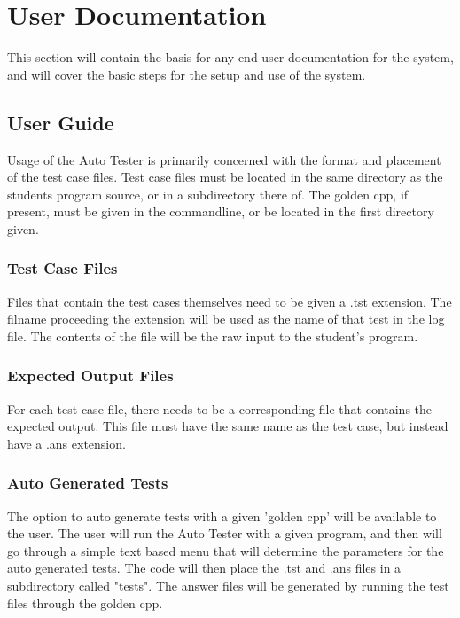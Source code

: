 
\chapter{User Documentation}

This section will contain the basis for any end user documentation for the system, 
and will cover the basic steps for the setup and use of the system.



\section{User Guide}
Usage of the Auto Tester is primarily concerned with the format and placement of the test case files. 
Test case files must be located in the same directory as the students program source, or in a subdirectory 
there of. The golden cpp, if present, must be given in the commandline, or be located in the first directory given.

\subsection{Test Case Files}
Files that contain the test cases themselves need to be given a .tst extension. The filname proceeding the 
extension will be used as the name of that test in the log file. The contents of the file will be the raw 
input to the student's program.

\subsection{Expected Output Files}
For each test case file, there needs to be a corresponding file that contains the expected output. This file 
must have the same name as the test case, but instead have a .ans extension.

\subsection{Auto Generated Tests}
The option to auto generate tests with a given 'golden cpp' will be available to the user. The user will run 
the Auto Tester with a given program, and then will go through a simple text based menu that will determine the 
parameters for the auto generated tests. The code will then place the .tst and .ans files in a subdirectory called "tests". The answer files will be generated by running the test files through the golden cpp.

